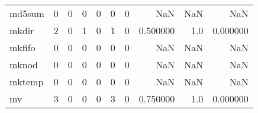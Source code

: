 \begin{longtable}{lrrrrrrrrr}
md5sum    &                                       0 &                                                  0 &                                                  0 &                                                  0 &                                                  0 &                                                  0 &                                                NaN &                                    NaN &                                  NaN \\
mkdir     &                                       2 &                                                  0 &                                                  1 &                                                  0 &                                                  1 &                                                  0 &                                           0.500000 &                                    1.0 &                             0.000000 \\
mkfifo    &                                       0 &                                                  0 &                                                  0 &                                                  0 &                                                  0 &                                                  0 &                                                NaN &                                    NaN &                                  NaN \\
mknod     &                                       0 &                                                  0 &                                                  0 &                                                  0 &                                                  0 &                                                  0 &                                                NaN &                                    NaN &                                  NaN \\
mktemp    &                                       0 &                                                  0 &                                                  0 &                                                  0 &                                                  0 &                                                  0 &                                                NaN &                                    NaN &                                  NaN \\
mv        &                                       3 &                                                  0 &                                                  0 &                                                  0 &                                                  3 &                                                  0 &                                           0.750000 &                                    1.0 &                             0.000000 \\

\end{longtable}
